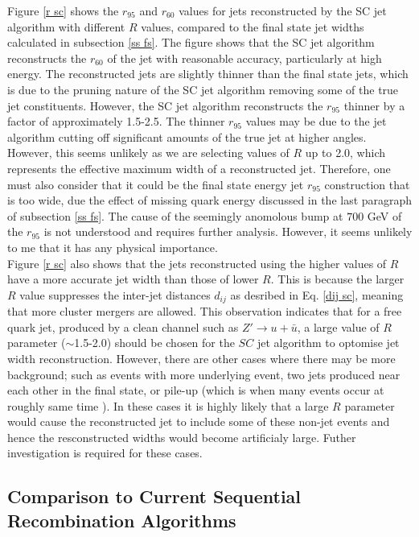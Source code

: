 \documentclass[a4paper,11pt, onecolumn]{article}
\begin{document}
  Figure \ref{r sc} shows the $r_{95}$ and $r_{60}$ values for jets reconstructed by the SC jet algorithm with different $R$ values,
  compared to the final state jet widths calculated in subsection \ref{ss fs}. The figure shows that the SC jet algorithm reconstructs the $r_{60}$ of the jet with
  reasonable accuracy, particularly at high energy. The reconstructed jets are slightly thinner than the final state jets, which is
  due to the pruning nature of the SC jet algorithm removing some of the true jet constituents. However, the SC jet algorithm reconstructs the $r_{95}$
  thinner by a factor of approximately 1.5-2.5. The thinner $r_{95}$ values may be due to the jet algorithm cutting off significant amounts of the true jet at higher angles.
  However, this seems unlikely as we are selecting values of $R$ up to 2.0, which represents the effective maximum width of a reconstructed jet. 
  Therefore, one must also consider that it could be the final state energy jet $r_{95}$ construction
  that is too wide, due the effect of missing quark energy discussed in the last paragraph of subsection \ref{ss fs}. 
  The cause of the seemingly anomolous bump at $700$ GeV of the $r_{95}$ is not understood and requires further analysis. However, it seems unlikely to me that it has any
  physical importance. \\

  
  Figure \ref{r sc} also shows that the jets reconstructed using the higher values of $R$ have a more accurate jet width than those of lower $R$. 
  This is because the larger $R$ value suppresses the inter-jet distances $d_{ij}$ as desribed in Eq. \eqref{dij sc}, meaning that more cluster 
  mergers are allowed. 
  This observation indicates that for a free quark jet, produced by a clean channel such as $Z' \to u + \bar{u}$, a large value of $R$ parameter ($\sim$1.5-2.0)
  should be chosen for the $SC$ jet algorithm to optomise jet width reconstruction.
  However, there are other cases where there may be more background; such as events with more underlying event, two jets produced near each other in the final state, 
  or pile-up (which is when many events occur at roughly same time \cite{pile-up}).
  In these cases it is highly likely that a large $R$ parameter would 
  cause the reconstructed jet to include some of these non-jet events and hence the resconstructed widths would become artificialy large.
  Futher investigation is required for these cases. 
  
 
 \subsection{Comparison to Current Sequential Recombination Algorithms} \label{ss others}
\end{document}
